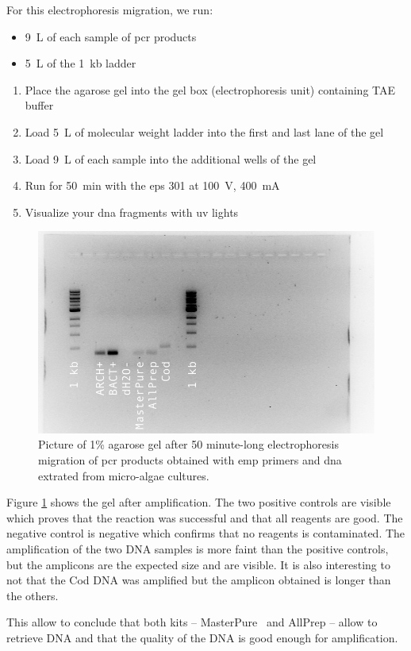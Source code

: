 For this electrophoresis migration, we run:
\begin{itemize}
\item 9~\textmu L of each sample of \gls{pcr} products
\item 5~\textmu L of the 1~kb ladder
\end{itemize}

\begin{enumerate}
\item Place the agarose gel into the gel box (electrophoresis unit) containing TAE buffer
\item Load 5~\textmu L of molecular weight ladder into the first and last lane of the gel
\item Load 9~\textmu L of each sample into the additional wells of the gel
\item Run for 50~min with the \gls{eps} 301 at 100~V, 400~mA
\item Visualize your \gls{dna} fragments with \gls{uv} lights
\end{enumerate}

\begin{figure}[H] %
    \centering
    \caption{Picture of 1\% agarose gel after 50 minute-long electrophoresis migration of \gls{pcr} products obtained with \gls{emp} primers and \gls{dna} extrated from micro-algae cultures.}
    \label{fig:20180211_EMP_OneTaq_MasterPure_vs_AllPrep}
    \includegraphics[width=\textwidth]{graphics/pic/20180211_EMP_OneTaq_MasterPure_vs_AllPrep.png}
\end{figure}

Figure \ref{fig:20180211_EMP_OneTaq_MasterPure_vs_AllPrep} shows the gel after amplification. The two positive controls are visible which proves that the reaction was successful and that all reagents are good. The negative control is negative which confirms that no reagents is contaminated. The amplification of the two DNA samples is more faint than the positive controls, but the amplicons are the expected size and are visible. It is also interesting to not that the Cod DNA was amplified but the amplicon obtained is longer than the others.

This allow to conclude that both kits -- MasterPure\texttrademark~ and AllPrep -- allow to retrieve DNA and that the quality of the DNA is good enough for amplification.
